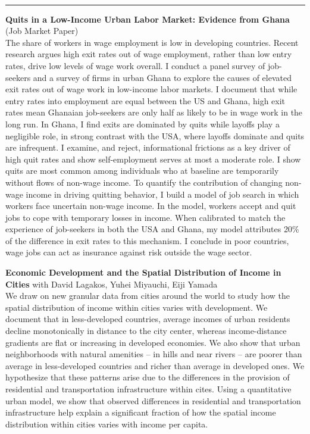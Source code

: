 \documentclass[12pt]{article}
\begin{document}
\newpage
\thispagestyle{plain}
 \\
\rule{\textwidth}{1pt}

\noindent \textbf{Quits in a Low-Income Urban Labor Market: Evidence from Ghana} (Job Market Paper)
\vspace{5pt}\\
\noindent The share of workers in wage employment is low in developing countries. Recent research argues high exit rates out of wage employment, rather than low entry rates, drive low levels of wage work overall. I conduct a panel survey of job-seekers and a survey of firms in urban Ghana to explore the causes of elevated exit rates out of wage work in low-income labor markets. I document that while entry rates into employment are equal between the US and Ghana, high exit rates mean Ghanaian job-seekers are only half as likely to be in wage work in the long run. In Ghana, I find exits are dominated by quits while layoffs play a negligible role, in strong contrast with the USA, where layoffs dominate and quits are infrequent. I examine, and reject, informational frictions as a key driver of high quit rates and show self-employment serves at most a moderate role. I show quits are most common among individuals who at baseline are temporarily without flows of non-wage income. To quantify the contribution of changing non-wage income in driving quitting behavior, I build a model of job search in which workers face uncertain non-wage income. In the model, workers accept and quit jobs to cope with temporary losses in income. When calibrated to match the experience of job-seekers in both the USA and Ghana, my model attributes 20\% of the difference in exit rates to this mechanism. I conclude in poor countries, wage jobs can act as insurance against risk outside the wage sector. \\
\vspace*{5pt}


\noindent \textbf{Economic Development and the Spatial Distribution of Income in Cities} with David Lagakos, Yuhei Miyauchi, Eiji Yamada
\vspace{5pt}\\
\noindent We draw on new granular data from cities around the world to study how the spatial distribution of income within cities varies with development. We document that in less-developed countries, average incomes of urban residents decline monotonically in distance to the city center, whereas income-distance gradients are flat or increasing in developed economies. We also show that urban neighborhoods with natural amenities  -- in hills and near rivers -- are poorer than average in less-developed countries and richer than average in developed ones. We hypothesize that these patterns arise due to the differences in the provision of residential and transportation infrastructure within cites. Using a quantitative urban model, we show that observed differences in residential and transportation infrastructure help explain a significant fraction of how the spatial income distribution within cities varies with income per capita.

\end{document}
